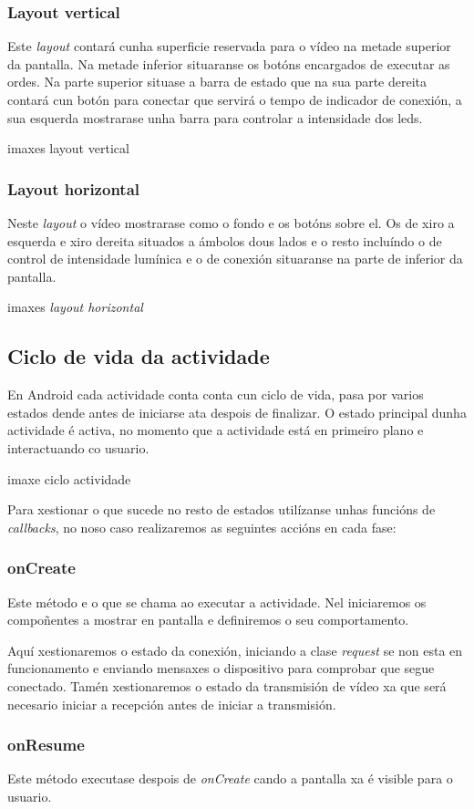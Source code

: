 \subsubsection{Layout vertical}
Este \emph{layout} contará cunha superficie reservada para o vídeo na metade superior da pantalla. Na metade inferior situaranse os botóns encargados de executar as ordes. Na parte superior situase a barra de estado que na sua parte dereita contará cun botón para conectar que servirá o tempo de indicador de conexión, a sua esquerda mostrarase unha barra para controlar a intensidade dos leds.

imaxes layout vertical
\subsubsection{Layout horizontal}
Neste \emph{layout} o vídeo mostrarase como o fondo e os botóns sobre el. Os de xiro a esquerda e xiro dereita situados a ámbolos dous lados e o resto incluíndo o de control de intensidade lumínica e o de conexión situaranse na parte de inferior da pantalla.

imaxes \emph{layout horizontal}
\subsection{Ciclo de vida da actividade}
En Android cada actividade conta conta cun ciclo de vida, pasa por varios estados dende antes de iniciarse ata despois de finalizar. O estado principal dunha actividade é activa, no momento que a actividade está en primeiro plano e interactuando co usuario.

imaxe ciclo actividade

Para xestionar o que sucede no resto de estados utilízanse unhas funcións de \emph{callbacks}, no noso caso realizaremos as seguintes accións en cada fase:
\subsubsection{onCreate}
Este método e o que se chama ao executar a actividade. Nel iniciaremos os compoñentes a mostrar en pantalla e definiremos o seu comportamento.

Aquí xestionaremos o estado da conexión, iniciando a clase \emph{request} se non esta en funcionamento e enviando mensaxes o dispositivo para comprobar que segue conectado. Tamén xestionaremos o estado da transmisión de vídeo xa que será necesario iniciar a recepción antes de iniciar a transmisión.
\subsubsection{onResume}
Este método executase despois de \emph{onCreate} cando a pantalla xa é visible para o usuario.

